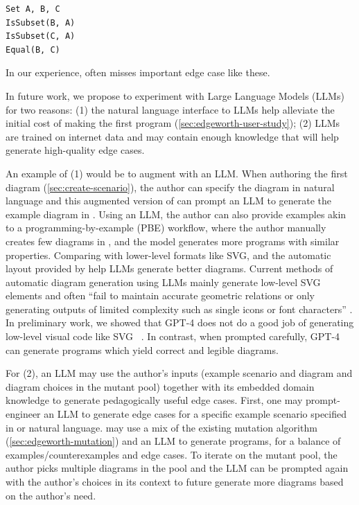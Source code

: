 \noindent\hspace*{\fill}
\begin{minipage}[c]{0.23\columnwidth}
\begin{mdframed}[style=SUBCode]
\begin{lstlisting}[language=Sub-SET,escapechar=@,numbers=none]
Set A, B, C
IsSubset(B, A)
IsSubset(C, A)
Equal(B, C)
\end{lstlisting}
\end{mdframed}
\end{minipage}
\hspace*{\fill}

\noindent In our experience, \Edgeworth often misses important edge case like these. 

In future work, we propose to experiment with Large Language Models (LLMs) for two reasons: (1) the natural language interface to LLMs help alleviate the initial cost of making the first \Substance{} program (\cref{sec:edgeworth-user-study}); (2) LLMs are trained on internet data and may contain enough knowledge that will help generate high-quality edge cases. 

An example of (1) would be to augment \Edgeworth with an LLM. When authoring the first diagram (\cref{sec:create-scenario}), the author can specify the diagram in natural language and this augmented version of \Edgeworth can prompt an LLM to generate the example diagram in \Substance. Using an LLM, the author can also provide examples akin to a programming-by-example (PBE) workflow, where the author manually creates few diagrams in \Substance, and the model generates more \Substance programs with similar properties. Comparing with lower-level formats like SVG, \Substance and the automatic layout provided by \Penrose{} help LLMs generate better diagrams. Current methods of automatic diagram generation using LLMs mainly generate low-level SVG elements and often ``fail to maintain accurate geometric relations or only generating outputs of limited complexity such as single icons or font characters'' \cite{belouadi_automatikz_2024}. In preliminary work, we showed that GPT-4 does not do a good job of generating low-level visual code like SVG~\cite{penrosellm} . In contrast, when prompted carefully, GPT-4 can generate \Substance programs which yield correct and legible diagrams.

For (2), an LLM may use the author's inputs (\ie example scenario \Substance and diagram and diagram choices in the mutant pool) together with its embedded domain knowledge to generate pedagogically useful edge cases. First, one may prompt-engineer an LLM to generate edge cases for a specific example scenario specified in \Substance or natural language. \Edgeworth may use a mix of the existing mutation algorithm (\cref{sec:edgeworth-mutation}) and an LLM to generate \Substance programs, for a balance of examples/counterexamples and edge cases. To iterate on the mutant pool, the author picks multiple diagrams in the pool and the LLM can be prompted again with the author's choices in its context to future generate more diagrams based on the author's need.

